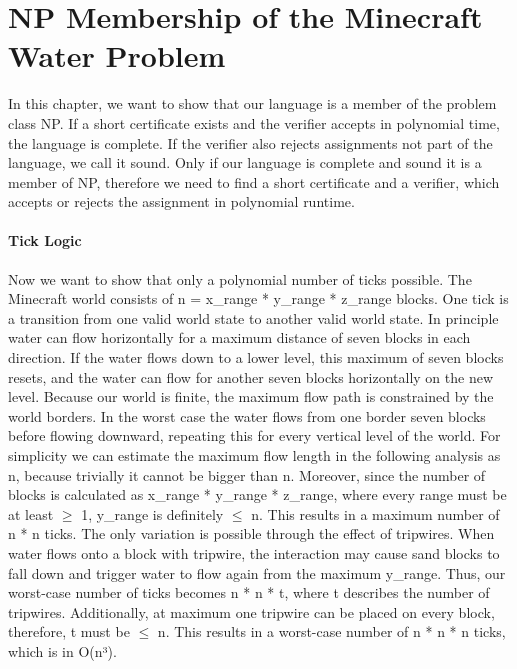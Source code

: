 \section{NP Membership of the Minecraft Water Problem}
In this chapter, we want to show that our language is a member of the problem class NP. If a short certificate exists and the verifier accepts in polynomial time, the language is complete. If the verifier also rejects assignments not part of the language, we call it sound. Only if our language is complete and sound it is a member of NP, therefore we need to find a short certificate and a verifier, which accepts or rejects the assignment in polynomial runtime.

\paragraph{Tick Logic}
Now we want to show that only a polynomial number of ticks possible. The Minecraft world consists of n = x\_range * y\_range * z\_range blocks. One tick is a transition from one valid world state to another valid world state. In principle water can flow horizontally for a maximum distance of seven blocks in each direction. If the water flows down to a lower level, this maximum of seven blocks resets, and the water can flow for another seven blocks horizontally on the new level. Because our world is finite, the maximum flow path is constrained by the world borders. In the worst case the water flows from one border seven blocks before flowing downward, repeating this for every vertical level of the world. For simplicity we can estimate the maximum flow length in the following analysis as n, because trivially it cannot be bigger than n. Moreover, since the number of blocks is calculated as x\_range * y\_range * z\_range, where every range must be at least $\geq$ 1, y\_range is definitely $\leq$ n. This results in a maximum number of n * n ticks. The only variation is possible through the effect of tripwires. When water flows onto a block with tripwire, the interaction may cause sand blocks to fall down and trigger water to flow again from the maximum y\_range. Thus, our worst-case number of ticks becomes n * n * t, where t describes the number of tripwires. Additionally, at maximum one tripwire can be placed on every block, therefore, t must be $\leq$ n. This results in a worst-case number of n * n * n ticks, which is in O(n³).

